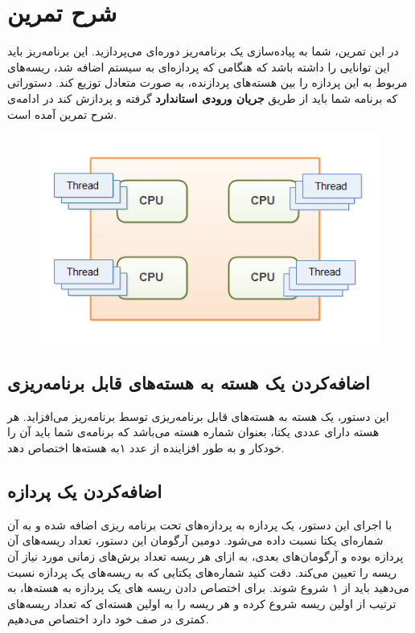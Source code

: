 \documentclass{utap}
\begin{document}
	\section{شرح تمرین}
	\hspace{5mm}
	در این تمرین، شما به پیاده‌سازی یک برنامه‌ریز دوره‌ای می‌پردازید. این برنامه‌ریز باید این توانایی را داشته باشد که هنگامی که پردازه‌ای به سیستم اضافه شد، ریسه‌های مربوط به این پردازه را بین هسته‌های پردازنده، به صورت متعادل توزیع کند. دستوراتی که برنامه شما باید از طریق \textbf{جریان ورودی استاندارد} گرفته و پردازش کند در ادامه‌ی شرح تمرین آمده است.
	
	\begin{figure}[H]
		\centering
		\includegraphics[width=0.5 \textwidth]{ThreadsOnCore.png}     
	\end{figure}
	
	
	\subsection{اضافه‌کردن یک هسته به هسته‌های قابل برنامه‌ریزی}
	\hspace{5mm}
	این دستور، یک هسته به هسته‌های قابل برنامه‌ریزی توسط برنامه‌ریز می‌افزاید. هر هسته دارای عددی یکتا، بعنوان شماره هسته می‌باشد که برنامه‌ی شما باید آن را خودکار و به طور افزاینده از عدد ۱به هسته‌ها اختصاص دهد.

	 \linespread{1.6}
	\begin{latin}%
		\centering
		\begin{minipage}[t]{1\textwidth}
			{}
			{}
		\end{minipage}%
	\end{latin}
	
	\subsection{اضافه‌کردن یک پردازه}
	\hspace{5mm}
	با اجرای این دستور، یک پردازه به پردازه‌های تحت برنامه ریزی اضافه‌ شده و به آن شماره‌ا‌‌ی یکتا نسبت داده می‌شود. دومین آرگومان این دستور، تعداد ریسه‌های آن پردازه بوده و آرگومان‌‌های بعدی، به ازای هر ریسه تعداد برش‌های زمانی مورد نیاز آن ریسه را تعیین می‌کند. دقت کنید شماره‌‌ها‌ی یکتایی که به ریسه‌های یک پردازه نسبت می‌دهید باید از ۱ شروع شوند. برای اختصاص دادن ریسه ‌های یک پردازه به هسته‌ها، به ترتیب از اولین ریسه شروع کرده و هر ریسه را به اولین هسته‌ای  که تعداد ریسه‌های کمتری در صف خود دارد اختصاص می‌دهیم.
	
\end{document}
